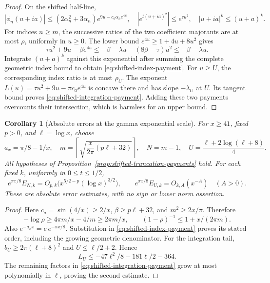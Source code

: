 \documentclass[11pt]{article}
\numberwithin{equation}{section}
\newtheorem{corollary}[theorem]{Corollary}
\theoremstyle{definition}
\theoremstyle{remark}
\begin{document}
\begin{proof}
On the shifted half-line,
\[
 |\phi_n(u+ia)|\le(2\alpha_n^2+3\alpha_n)
 e^{9u-c_a\alpha_ne^{4u}},\quad
 |e^{t(u+ia)^2}|\le e^{\tau u^2},\quad |u+ia|^k\le(u+a)^k.
\]
For indices \(n\ge m\), the successive ratios of the two coefficient
majorants are at most \(\rho\), uniformly in \(u\ge0\).
The lower bound \(e^{4u}\ge1+4u+8u^2\) gives
\[
 \tau u^2+9u-\beta e^{4u}
 \le-\beta-\lambda u-(8\beta-\tau)u^2
 \le-\beta-\lambda u.
\]
Integrate \((u+a)^k\) against this exponential after summing the
complete geometric index bound to obtain \eqref{eq:shifted-index-payment}.
For \(u\ge U\), the corresponding index ratio is at most \(\rho_U\).
The exponent \(L(u)=\tau u^2+9u-\pi c_ae^{4u}\) is concave there
and has slope \(-\lambda_U\) at \(U\). Its tangent bound proves
\eqref{eq:shifted-integration-payment}. Adding these two payments
overcounts their intersection, which is harmless for an upper bound.
\end{proof}

\begin{corollary}[Absolute errors at the gamma exponential scale]
\label{cor:adaptive-contour-scale}
For \(x\ge41\), fixed \(p>0\), and \(\ell=\log x\), choose
\[
 a_x=\pi/8-1/x,\quad
 m=\left\lceil\sqrt{\frac{x}{2\pi}(p\ell+32)}\right\rceil,
 \quad N=m-1,\quad U=\frac{\ell+2\log(\ell+8)}4.
\]
All hypotheses of Proposition~\ref{prop:shifted-truncation-payments}
hold. For each fixed \(k\), uniformly in \(0\le t\le1/2\),
\begin{equation}
 e^{\pi x/8}E_{N,k}
 =O_{p,k}\bigl(x^{5/2-p}(\log x)^{3/2}\bigr),
 \qquad e^{\pi x/8}E_{U,k}=O_{k,A}(x^{-A})\quad(A>0).
 \label{eq:adaptive-contour-errors}
\end{equation}
These are absolute error estimates, with no sign or lower norm assertion.
\end{corollary}

\begin{proof}
Here \(c_a=\sin(4/x)\ge2/x\), \(\beta\ge p\ell+32\), and
\(m^2\ge2x/\pi\). Therefore
\[
 -\log\rho\ge4\pi m/x-4/m\ge2\pi m/x,
 \qquad (1-\rho)^{-1}\le1+x/(2\pi m).
\]
Also \(e^{-a_xx}=e\,e^{-\pi x/8}\). Substitution in
\eqref{eq:shifted-index-payment} proves its stated order, including
the growing geometric denominator. For the integration tail,
\(b_U\ge2\pi(\ell+8)^2\) and \(U\le\ell/2+2\). Hence
\[
 L_U\le-47\ell^2/8-181\ell/2-364.
\]
The remaining factors in \eqref{eq:shifted-integration-payment} grow
at most polynomially in \(\ell\), proving the second estimate.
\end{proof}
\end{document}
